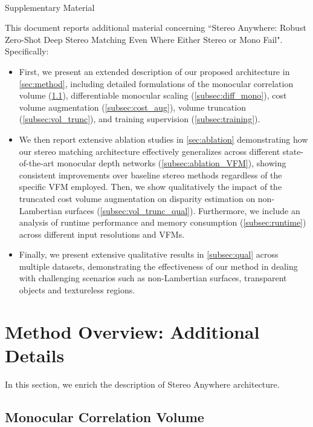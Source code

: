\documentclass[10pt,twocolumn,letterpaper]{article}
\newcommand{\method}[0]{Stereo Anywhere\xspace}
\begin{document}
{
    \clearpage
    \centering
    \Large
    \textbf{\thetitle}\\
    \vspace{0.5em}Supplementary Material \\
    \vspace{1.0em}
}

This document reports additional material concerning ``Stereo Anywhere: Robust Zero-Shot Deep Stereo Matching Even Where Either Stereo or Mono Fail". Specifically:

\begin{itemize}
    \item First, we present an extended description of our proposed architecture in \cref{sec:method}, including detailed formulations of the monocular correlation volume (\cref{subsec:mono_corr}), differentiable monocular scaling (\cref{subsec:diff_mono}), cost volume augmentation (\cref{subsec:cost_aug}), volume truncation (\cref{subsec:vol_trunc}), and training supervision (\cref{subsec:training}).

    \item We then report extensive ablation studies in \cref{sec:ablation} demonstrating how our stereo matching architecture effectively generalizes across different state-of-the-art monocular depth networks (\cref{subsec:ablation_VFM}), showing consistent improvements over baseline stereo methods regardless of the specific VFM employed.
    Then, we show qualitatively the impact of the truncated cost volume augmentation on disparity estimation on non-Lambertian surfaces (\cref{subsec:vol_trunc_qual}). Furthermore, we include an analysis of runtime performance and memory consumption (\cref{subsec:runtime}) across different input resolutions and VFMs.

    \item Finally, we present extensive qualitative results in \cref{subsec:qual} across multiple datasets, demonstrating the effectiveness of our method in dealing with challenging scenarios such as non-Lambertian surfaces, transparent objects and textureless regions.
\end{itemize}

\section{Method Overview: Additional Details}

In this section, we enrich the description of \method architecture.

\subsection{Monocular Correlation Volume}
\label{subsec:mono_corr}
\end{document}
